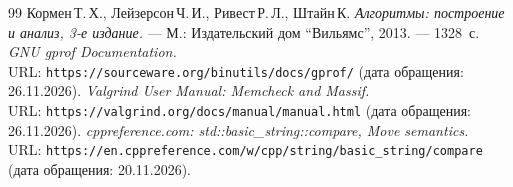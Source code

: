 \begin{thebibliography}{99}
Кормен\,Т.\,Х., Лейзерсон\,Ч.\,И., Ривест\,Р.\,Л., Штайн\,К.
{\itshape Алгоритмы: построение и анализ, 3-е издание.} --- М.: Издательский дом \enquote{Вильямс}, 2013. --- 1328~с.
{\itshape GNU gprof Documentation.} \\URL: \texttt{https://sourceware.org/binutils/docs/gprof/} (дата обращения: 26.11.2026).
{\itshape Valgrind User Manual: Memcheck and Massif.} \\URL: \texttt{https://valgrind.org/docs/manual/manual.html} (дата обращения: 26.11.2026).
{\itshape cppreference.com: std::basic\_string::compare, Move semantics.} \\URL: \texttt{https://en.cppreference.com/w/cpp/string/basic\_string/compare} (дата обращения: 20.11.2026).
\end{thebibliography}
\pagebreak
